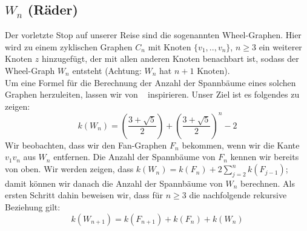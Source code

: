 \subsection{$W_n$ (Räder)}
Der vorletzte Stop auf unserer Reise sind die sogenannten Wheel-Graphen. Hier wird zu einem zyklischen Graphen $C_n$ mit Knoten $\{v_1,..,v_n\}$, $n \geq 3$ ein weiterer Knoten $z$ hinzugefügt, der mit allen anderen Knoten benachbart ist, sodass der Wheel-Graph $W_{n}$ entsteht (Achtung: $W_n$ hat $n+1$ Knoten).\\
Um eine Formel für die Berechnung der Anzahl der Spannbäume eines solchen Graphen herzuleiten, lassen wir von ~\cite{sedlacek_1970} inspirieren.
Unser Ziel ist es folgendes zu zeigen:
\begin{equation}
 \mathit{k}(W_n) = (\frac{3+\sqrt{5}}{2})+(\frac{3+\sqrt{5}}{2})^n-2
\end{equation}
Wir beobachten, dass wir den Fan-Graphen $F_n$ bekommen, wenn wir die Kante $v_1v_n$ aus $W_n$ entfernen.
Die Anzahl der Spannbäume von $F_n$ kennen wir bereits von oben.
Wir werden zeigen, dass $\mathit{k}(W_n) = \mathit{k}(F_n) + 2 \sum_{j=2}^n\mathit{k}(F_{j-1})$;
damit können wir danach die Anzahl der Spannbäume von $W_n$ berechnen.
Als ersten Schritt dahin beweisen wir, dass für $n \geq 3$ die nachfolgende rekursive Beziehung gilt:
\begin{equation}
 \mathit{k}(W_{n+1}) = \mathit{k}(F_{n+1}) + \mathit{k}(F_n) + \mathit{k}(W_n)
\end{equation}
